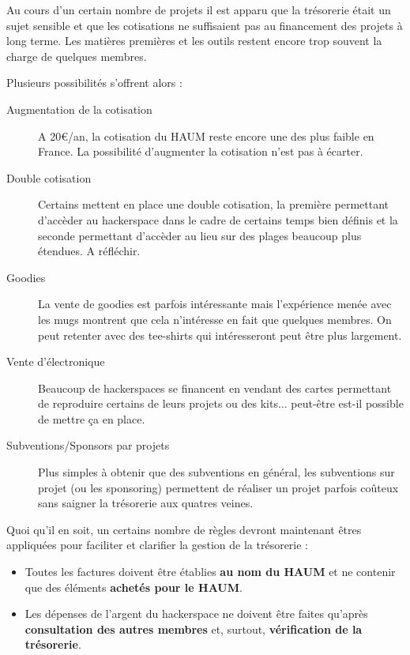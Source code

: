 \documentclass[11pt]{article}
\begin{document}
Au cours d'un certain nombre de projets il est apparu que la trésorerie était un sujet sensible et que les cotisations
ne suffisaient pas au financement des projets à long terme. Les matières premières et les outils restent encore trop
souvent la charge de quelques membres.

Plusieurs possibilités s'offrent alors :

\begin{description}
	\item[Augmentation de la cotisation] A 20\euro/an, la cotisation du HAUM reste encore une des plus faible en France. La
		possibilité d'augmenter la cotisation n'est pas à écarter.
	\item[Double cotisation] Certains mettent en place une double cotisation, la première permettant d'accèder au
		hackerspace dans le cadre de certains temps bien définis et la seconde permettant d'accèder au lieu sur des
		plages beaucoup plus étendues. A réfléchir.
	\item[Goodies] La vente de goodies est parfois intéressante mais l'expérience menée avec les mugs montrent que cela
		n'intéresse en fait que quelques membres. On peut retenter avec des tee-shirts qui intéresseront peut être plus
		largement.
	\item[Vente d'électronique] Beaucoup de hackerspaces se financent en vendant des cartes permettant de reproduire
		certains de leurs projets ou des kits... peut-être est-il possible de mettre ça en place.
	\item[Subventions/Sponsors par projets] Plus simples à obtenir que des subventions en général, les subventions sur
		projet (ou les sponsoring) permettent de réaliser un projet parfois coûteux sans saigner la trésorerie aux
		quatres veines.
\end{description}

Quoi qu'il en soit, un certains nombre de règles devront maintenant êtres appliquées pour faciliter et clarifier la
gestion de la trésorerie :

\begin{itemize}
	\item Toutes les factures doivent être établies \textbf{au nom du HAUM} et ne contenir que des éléments
		\textbf{achetés pour le HAUM}. 
	\item Les dépenses de l'argent du hackerspace ne doivent être faites qu'après \textbf{consultation des autres
		membres} et, surtout, \textbf{vérification de la trésorerie}.
\end{itemize}
\end{document}
